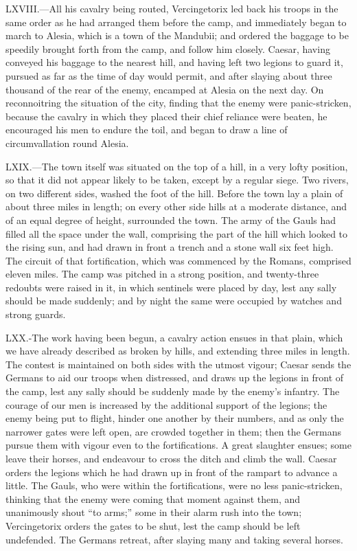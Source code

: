 LXVIII.—All his cavalry being routed, Vercingetorix led back his troops
in the same order as he had arranged them before the camp, and
immediately began to march to Alesia, which is a town of the Mandubii;
and ordered the baggage to be speedily brought forth from the camp, and
follow him closely. Caesar, having conveyed his baggage to the nearest
hill, and having left two legions to guard it, pursued as far as the
time of day would permit, and after slaying about three thousand of the
rear of the enemy, encamped at Alesia on the next day. On reconnoitring
the situation of the city, finding that the enemy were panic-stricken,
because the cavalry in which they placed their chief reliance were
beaten, he encouraged his men to endure the toil, and began to draw a
line of circumvallation round Alesia.

LXIX.—The town itself was situated on the top of a hill, in a very
lofty position, so that it did not appear likely to be taken, except by
a regular siege. Two rivers, on two different sides, washed the foot of
the hill. Before the town lay a plain of about three miles in length; on
every other side hills at a moderate distance, and of an equal degree of
height, surrounded the town. The army of the Gauls had filled all the
space under the wall, comprising the part of the hill which looked to
the rising sun, and had drawn in front a trench and a stone wall six
feet high. The circuit of that fortification, which was commenced by the
Romans, comprised eleven miles. The camp was pitched in a strong
position, and twenty-three redoubts were raised in it, in which
sentinels were placed by day, lest any sally should be made suddenly;
and by night the same were occupied by watches and strong guards.

LXX.-The work having been begun, a cavalry action ensues in that plain,
which we have already described as broken by hills, and extending three
miles in length. The contest is maintained on both sides with the utmost
vigour; Caesar sends the Germans to aid our troops when distressed, and
draws up the legions in front of the camp, lest any sally should be
suddenly made by the enemy's infantry. The courage of our men is
increased by the additional support of the legions; the enemy being put
to flight, hinder one another by their numbers, and as only the narrower
gates were left open, are crowded together in them; then the Germans
pursue them with vigour even to the fortifications. A great slaughter
ensues; some leave their horses, and endeavour to cross the ditch and
climb the wall. Caesar orders the legions which he had drawn up in front
of the rampart to advance a little. The Gauls, who were within the
fortifications, were no less panic-stricken, thinking that the enemy
were coming that moment against them, and unanimously shout ``to arms;''
some in their alarm rush into the town; Vercingetorix orders the gates
to be shut, lest the camp should be left undefended. The Germans
retreat, after slaying many and taking several horses.

